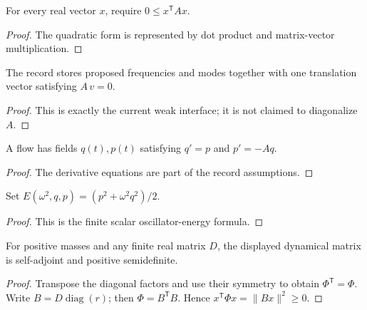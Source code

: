 \begin{definition}
\label{def:harmonic:positive-semidefinite}
For every real vector $x$, require $0\le x^\mathsf T A x$.
\end{definition}
\begin{proof}The quadratic form is represented by dot product and matrix-vector multiplication.\end{proof}

\begin{definition}
\label{def:harmonic:normal-mode-interface}
The record stores proposed frequencies and modes together with one translation vector satisfying $A\,v=0$.
\end{definition}
\begin{proof}This is exactly the current weak interface; it is not claimed to diagonalize $A$.\end{proof}

\begin{definition}
\label{def:harmonic:flow}
A flow has fields $q(t),p(t)$ satisfying $q'=p$ and $p'=-Aq$.
\end{definition}
\begin{proof}The derivative equations are part of the record assumptions.\end{proof}

\begin{definition}
\label{def:harmonic:modal-energy}
Set $E(\omega^2,q,p)=(p^2+\omega^2q^2)/2$.
\end{definition}
\begin{proof}This is the finite scalar oscillator-energy formula.\end{proof}

\begin{theorem}
\label{thm:physics:harmonic_operator:target}
For positive masses and any finite real matrix $D$, the displayed dynamical matrix is self-adjoint and positive semidefinite.
\end{theorem}
\begin{proof}
Transpose the diagonal factors and use their symmetry to obtain $\Phi^\mathsf T=\Phi$. Write $B=D\operatorname{diag}(r)$; then $\Phi=B^\mathsf TB$. Hence $x^\mathsf T\Phi x=\lVert Bx\rVert^2\ge0$.
\end{proof}
